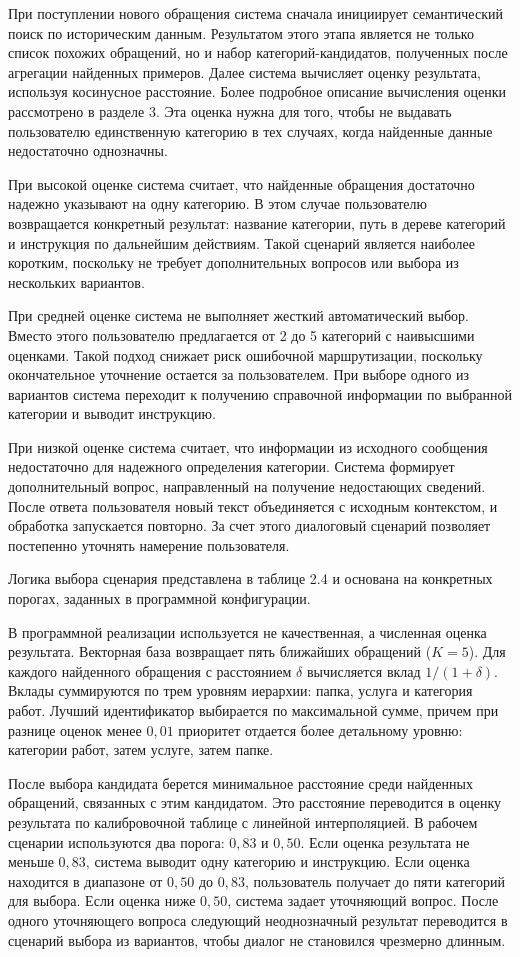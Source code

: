 \documentclass[14pt,a4paper]{extarticle}
\numberwithin{figure}{section}
\numberwithin{table}{section}
\begin{document}
При поступлении нового обращения система сначала инициирует
семантический поиск по историческим данным. Результатом этого этапа
является не только список похожих обращений, но и набор
категорий-кандидатов, полученных после агрегации найденных примеров.
Далее система вычисляет оценку результата, используя
косинусное расстояние. Более подробное описание вычисления оценки
рассмотрено в разделе 3. Эта оценка нужна для того, чтобы не выдавать
пользователю единственную категорию в тех случаях, когда найденные
данные недостаточно однозначны.

При высокой оценке система считает, что найденные обращения
достаточно надежно указывают на одну категорию. В этом случае
пользователю возвращается конкретный результат: название категории, путь
в дереве категорий и инструкция по дальнейшим действиям. Такой сценарий
является наиболее коротким, поскольку не требует дополнительных вопросов
или выбора из нескольких вариантов.

При средней оценке система не выполняет жесткий
автоматический выбор. Вместо этого пользователю предлагается от 2 до 5
категорий с наивысшими оценками. Такой подход снижает риск ошибочной
маршрутизации, поскольку окончательное уточнение остается за
пользователем. При выборе одного из вариантов система переходит к
получению справочной информации по выбранной категории и выводит
инструкцию.

При низкой оценке система считает, что информации из
исходного сообщения недостаточно для надежного определения категории.
Система формирует дополнительный вопрос, направленный на получение
недостающих сведений. После ответа пользователя новый текст объединяется
с исходным контекстом, и обработка запускается повторно. За счет этого
диалоговый сценарий позволяет постепенно уточнять намерение
пользователя.

Логика выбора сценария представлена в таблице 2.4 и основана на конкретных порогах, заданных в программной конфигурации.

В программной реализации используется не качественная, а численная оценка результата. Векторная база возвращает пять ближайших обращений (\(K=5\)). Для каждого найденного обращения с расстоянием \(\delta\) вычисляется вклад \(1/(1+\delta)\). Вклады суммируются по трем уровням иерархии: папка, услуга и категория работ. Лучший идентификатор выбирается по максимальной сумме, причем при разнице оценок менее \(0{,}01\) приоритет отдается более детальному уровню: категории работ, затем услуге, затем папке.

После выбора кандидата берется минимальное расстояние среди найденных обращений, связанных с этим кандидатом. Это расстояние переводится в оценку результата по калибровочной таблице с линейной интерполяцией. В рабочем сценарии используются два порога: \(0{,}83\) и \(0{,}50\). Если оценка результата не меньше \(0{,}83\), система выводит одну категорию и инструкцию. Если оценка находится в диапазоне от \(0{,}50\) до \(0{,}83\), пользователь получает до пяти категорий для выбора. Если оценка ниже \(0{,}50\), система задает уточняющий вопрос. После одного уточняющего вопроса следующий неоднозначный результат переводится в сценарий выбора из вариантов, чтобы диалог не становился чрезмерно длинным.
\end{document}
